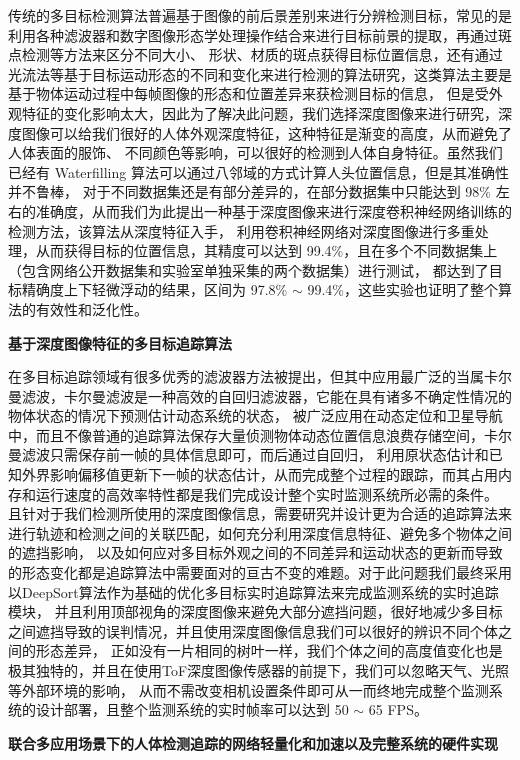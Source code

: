 传统的多目标检测算法普遍基于图像的前后景差别来进行分辨检测目标，常见的是利用各种滤波器和数字图像形态学处理操作结合来进行目标前景的提取，再通过斑点检测等方法来区分不同大小、
形状、材质的斑点获得目标位置信息，还有通过光流法等基于目标运动形态的不同和变化来进行检测的算法研究，这类算法主要是基于物体运动过程中每帧图像的形态和位置差异来获检测目标的信息，
但是受外观特征的变化影响太大，因此为了解决此问题，我们选择深度图像来进行研究，深度图像可以给我们很好的人体外观深度特征，这种特征是渐变的高度，从而避免了人体表面的服饰、
不同颜色等影响，可以很好的检测到人体自身特征。虽然我们已经有 Waterfilling 算法可以通过八邻域的方式计算人头位置信息，但是其准确性并不鲁棒，
对于不同数据集还是有部分差异的，在部分数据集中只能达到 98\% 左右的准确度，从而我们为此提出一种基于深度图像来进行深度卷积神经网络训练的检测方法，该算法从深度特征入手，
利用卷积神经网络对深度图像进行多重处理，从而获得目标的位置信息，其精度可以达到 99.4\%，且在多个不同数据集上（包含网络公开数据集和实验室单独采集的两个数据集）进行测试，
都达到了目标精确度上下轻微浮动的结果，区间为 97.8\% $\sim$ 99.4\%，这些实验也证明了整个算法的有效性和泛化性。

\textbf{基于深度图像特征的多目标追踪算法}

在多目标追踪领域有很多优秀的滤波器方法被提出，但其中应用最广泛的当属卡尔曼滤波，卡尔曼滤波是一种高效的自回归滤波器，它能在具有诸多不确定性情况的物体状态的情况下预测估计动态系统的状态，
被广泛应用在动态定位和卫星导航中，而且不像普通的追踪算法保存大量侦测物体动态位置信息浪费存储空间，卡尔曼滤波只需保存前一帧的具体信息即可，而后通过自回归，
利用原状态估计和已知外界影响偏移值更新下一帧的状态估计，从而完成整个过程的跟踪，而其占用内存和运行速度的高效率特性都是我们完成设计整个实时监测系统所必需的条件。
且针对于我们检测所使用的深度图像信息，需要研究并设计更为合适的追踪算法来进行轨迹和检测之间的关联匹配，如何充分利用深度信息特征、避免多个物体之间的遮挡影响，
以及如何应对多目标外观之间的不同差异和运动状态的更新而导致的形态变化都是追踪算法中需要面对的亘古不变的难题。对于此问题我们最终采用以DeepSort算法作为基础的优化多目标实时追踪算法来完成监测系统的实时追踪模块，
并且利用顶部视角的深度图像来避免大部分遮挡问题，很好地减少多目标之间遮挡导致的误判情况，并且使用深度图像信息我们可以很好的辨识不同个体之间的形态差异，
正如没有一片相同的树叶一样，我们个体之间的高度值变化也是极其独特的，并且在使用ToF深度图像传感器的前提下，我们可以忽略天气、光照等外部环境的影响，
从而不需改变相机设置条件即可从一而终地完成整个监测系统的设计部署，且整个监测系统的实时帧率可以达到 50 $\sim$ 65 FPS。

\textbf{联合多应用场景下的人体检测追踪的网络轻量化和加速以及完整系统的硬件实现}

